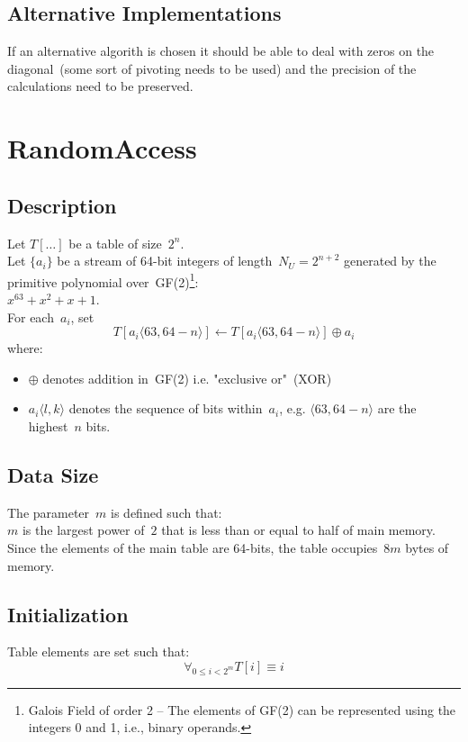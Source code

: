 \documentclass[twocolumn,draft]{article}
\newcommand{\RANDA}{\textsf{RandomAccess}\xspace}
\begin{document}
\subsection{Alternative Implementations}
If an alternative algorith is chosen it should be able to deal with zeros on
the diagonal~(some sort of pivoting needs to be used) and the precision of the
calculations need to be preserved.

\section{\RANDA}
\subsection{Description}
Let $T[\ldots]$ be a table of size~$2^n$. \\
Let $\{a_i\}$ be a stream of 64-bit integers of length~$N_U=2^{n+2}$ generated by
the primitive polynomial over~GF(2)\footnote{Galois Field of order 2 -- The
  elements of GF(2) can be represented using the integers 0 and 1, i.e., binary
  operands.}: \\ $x^{63}+x^2+x+1$. \\
For each~$a_i$, set
\begin{equation}
  T[a_i\langle 63,64-n\rangle] \leftarrow T[a_i\langle 63,64-n\rangle]\oplus a_i
\label{eqn:raupdate}
\end{equation}
where:
\begin{itemize}
\item $\oplus$ denotes addition in~GF(2) i.e. "exclusive or"~(XOR)
\item $a_i\langle l,k\rangle$ denotes the sequence of bits within~$a_i$, e.g.
  $\langle 63, 64-n\rangle$ are the highest~$n$ bits.
\end{itemize}

\subsection{Data Size}
The parameter~$m$ is defined such that: \\
$m$ is the largest power of~$2$ that is less than or equal to half of main memory.
Since the elements of the main table are 64-bits, the table occupies~$8m$ bytes
of memory.

\subsection{Initialization}
Table elements are set such that:
\begin{equation}
  \forall_{0\le i< 2^m} T[i]\equiv i
\label{eqn:raset}
\end{equation}
\end{document}
